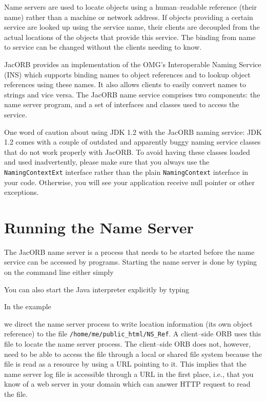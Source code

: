 
Name  servers  are used  to  locate  objects  using a  human--readable
reference (their  name) rather than  a machine or network  address. If
objects providing  a certain service  are looked up using  the service
name, their  clients are  decoupled from the  actual locations  of the
objects that provide  this service.  The binding from  name to service
can be changed without the clients needing to know.

JacORB provides an implementation of the OMG's Interoperable Naming
Service (INS) which supports binding names to object references and to
lookup object references using these names.  It also allows clients to
easily convert names to strings and vice versa.  The JacORB name
service comprises two components: the name server program, and a set
of interfaces and classes used to access the service.


One word of caution about using JDK 1.2 with the JacORB naming
service: JDK 1.2 comes with a couple of outdated and apparently buggy
naming service classes that do not work properly with JacORB. To avoid
having these classes loaded and used inadvertently, please make sure
that you always use the {\tt NamingContextExt} interface rather than
the plain {\tt NamingContext} interface in your code. Otherwise, you
will see your application receive null pointer or other exceptions.

\section{Running the Name Server}

The JacORB  name server is a  process that needs to  be started before
the name service can be accessed by programs. Starting the name server
is done by typing on the command line either simply


You can also start the Java interpreter explicitly by typing


In the example


we direct the name server process to write location information (its
own object reference) to the file {\tt /home/me/public\_html/NS\_Ref}.
A client--side ORB uses this file to locate the name server process.
The client--side ORB does not, however, need to be able to access the file through a
local or shared file system because  the file is read as a
 resource by using a URL pointing to it.  This implies that the
name server log file is accessible through a URL in the first place,
i.e., that you know of a web server in your domain which can answer
HTTP request to read the file.

